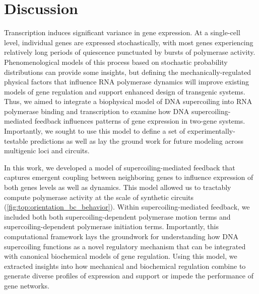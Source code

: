 \documentclass[11pt]{article}
\begin{document}
\FloatBarrier
\section{Discussion}
Transcription induces significant variance in gene expression. At a single-cell level, individual genes are expressed stochastically, with most genes experiencing relatively long periods of quiescence punctuated by bursts of polymerase activity. Phenomenological models of this process based on stochastic probability distributions can provide some insights, but defining the mechanically-regulated physical factors that influence RNA polymerase dynamics  will improve existing models of gene regulation and support enhanced design of transgenic systems. Thus, we aimed to integrate a biophysical model of DNA supercoiling into RNA polymerase binding and transcription to examine how DNA supercoiling-mediated feedback influences patterns of gene expression in two-gene systems. Importantly, we sought to use this model to define a set of experimentally-testable predictions  as well as lay the ground work for future modeling across multigenic loci and circuits. 
 
In this work, we developed a model of supercoiling-mediated feedback that captures emergent coupling between neighboring genes to influence expression of both genes levels as well as dynamics.  This model allowed us to tractably compute polymerase activity at the scale of synthetic circuits (\cref{fig:top:orientation_bc_behavior}). Within supercoiling-mediated feedback, we included both both supercoiling-dependent polymerase motion terms and supercoiling-dependent polymerase initiation terms. Importantly, this computational framework lays the groundwork for understanding how DNA supercoiling functions as a novel regulatory mechanism that can be integrated with canonical biochemical models of gene regulation. Using this model, we extracted insights into how mechanical and biochemical regulation combine to generate diverse profiles of expression and support or impede the performance of gene networks.
\end{document}
